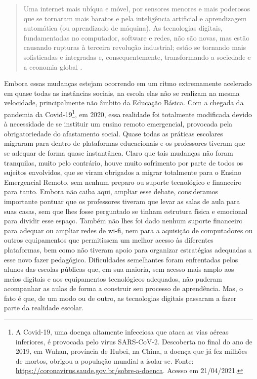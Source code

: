 \documentclass{textolivre}
\begin{document}
\begin{quote}
Uma internet mais ubíqua e móvel, por sensores menores e mais poderosos que se tornaram mais baratos e pela inteligência artificial e aprendizagem automática (ou aprendizado de máquina). As tecnologias digitais, fundamentadas no computador, software e redes, não são novas, mas estão causando rupturas à terceira revolução industrial; estão se tornando mais sofisticadas e integradas e, consequentemente, transformando a sociedade e a economia global \cite[p.~19]{schwab2016}.
\end{quote}

Embora essas mudanças estejam ocorrendo em um ritmo extremamente acelerado em quase todas as instâncias sociais, na escola elas não se realizam na mesma velocidade, principalmente não âmbito da Educação Básica. Com a chegada da pandemia da Covid-19\footnote{A Covid-19, uma doença altamente infecciosa que ataca as vias aéreas inferiores, é provocada pelo vírus SARS-CoV-2. Descoberta no final do ano de 2019, em Wuhan, província de Hubei, na China, a doença que já fez milhões de mortos, obrigou a população mundial a isolar-se. Fonte: \url{https://coronavirus.saude.gov.br/sobre-a-doenca}. Acesso em 21/04/2021.}, em 2020, essa realidade foi totalmente modificada devido à necessidade de se instituir um ensino remoto emergencial, provocada pela obrigatoriedade do afastamento social. Quase todas as práticas escolares migraram para dentro de plataformas educacionais e os professores tiveram que se adequar de forma quase instantânea. Claro que tais mudanças não foram tranquilas, muito pelo contrário, houve muito sofrimento por parte de todos os sujeitos envolvidos, que se viram obrigados a migrar totalmente para o Ensino Emergencial Remoto, sem nenhum preparo ou suporte tecnológico e financeiro para tanto. Embora não caiba aqui, ampliar esse debate, consideramos importante pontuar que os professores tiveram que levar as salas de aula para suas casas, sem que lhes fosse perguntado se tinham estrutura física e emocional para dividir esse espaço. Também não lhes foi dado nenhum suporte financeiro para adequar ou ampliar redes de wi-fi, nem para a aquisição de computadores ou outros equipamentos que permitissem um melhor acesso às diferentes plataformas, bem como não tiveram apoio para organizar estratégias adequadas a esse novo fazer pedagógico.  Dificuldades semelhantes foram enfrentadas pelos alunos das escolas públicas que, em sua maioria, sem acesso mais amplo aos meios digitais e aos equipamentos tecnológicos adequados, não puderam acompanhar as aulas de forma a construir seu processo de aprendência. Mas, o fato é que, de um modo ou de outro, as tecnologias digitais passaram a fazer parte da realidade escolar.
\end{document}
